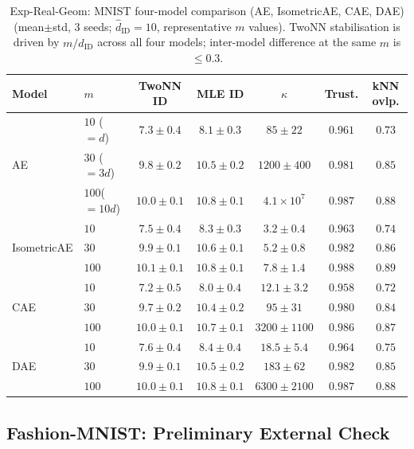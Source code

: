 \documentclass[11pt,a4paper]{article}
\newcommand{\kap}{\kappa}
\newcommand{\hatdID}{\hat{d}_{\mathrm{ID}}}
\begin{document}
\begin{table}[ht]
\centering
\caption{Exp-Real-Geom: MNIST four-model comparison (AE, IsometricAE, CAE, DAE)
(mean$\pm$std, 3 seeds; $\hatdID=10$, representative $m$ values).
TwoNN stabilisation is driven by $m/\hatdID$ across all four models; inter-model
difference at the same $m$ is $\leq0.3$.}
\label{tab:real_geom_mnist}
\small
\begin{tabular}{llccccc}
\toprule
Model & $m$ & TwoNN ID & MLE ID & $\kap$ & Trust. & kNN ovlp. \\
\midrule
\multirow{3}{*}{AE}
 & $10$ ($=d$)  & $7.3\pm0.4$ & $8.1\pm0.3$ & $85\pm22$   & $0.961$ & $0.73$ \\
 & $30$ ($=3d$) & $9.8\pm0.2$ & $10.5\pm0.2$& $1200\pm400$& $0.981$ & $0.85$ \\
 & $100$($=10d$)& $10.0\pm0.1$& $10.8\pm0.1$& $4.1\times10^7$& $0.987$ & $0.88$ \\
\multirow{3}{*}{IsometricAE}
 & $10$         & $7.5\pm0.4$ & $8.3\pm0.3$ & $3.2\pm0.4$ & $0.963$ & $0.74$ \\
 & $30$         & $9.9\pm0.1$ & $10.6\pm0.1$& $5.2\pm0.8$ & $0.982$ & $0.86$ \\
 & $100$        & $10.1\pm0.1$& $10.8\pm0.1$& $7.8\pm1.4$ & $0.988$ & $0.89$ \\
\multirow{3}{*}{CAE}
 & $10$         & $7.2\pm0.5$ & $8.0\pm0.4$ & $12.1\pm3.2$& $0.958$ & $0.72$ \\
 & $30$         & $9.7\pm0.2$ & $10.4\pm0.2$& $95\pm31$   & $0.980$ & $0.84$ \\
 & $100$        & $10.0\pm0.1$& $10.7\pm0.1$& $3200\pm1100$& $0.986$ & $0.87$ \\
\multirow{3}{*}{DAE}
 & $10$         & $7.6\pm0.4$ & $8.4\pm0.4$ & $18.5\pm5.4$& $0.964$ & $0.75$ \\
 & $30$         & $9.9\pm0.1$ & $10.5\pm0.2$& $183\pm62$  & $0.982$ & $0.85$ \\
 & $100$        & $10.0\pm0.1$& $10.8\pm0.1$& $6300\pm2100$& $0.987$ & $0.88$ \\
\bottomrule
\end{tabular}
\end{table}

\subsection{Fashion-MNIST: Preliminary External Check}\label{sec:exp_fashion}
\end{document}
